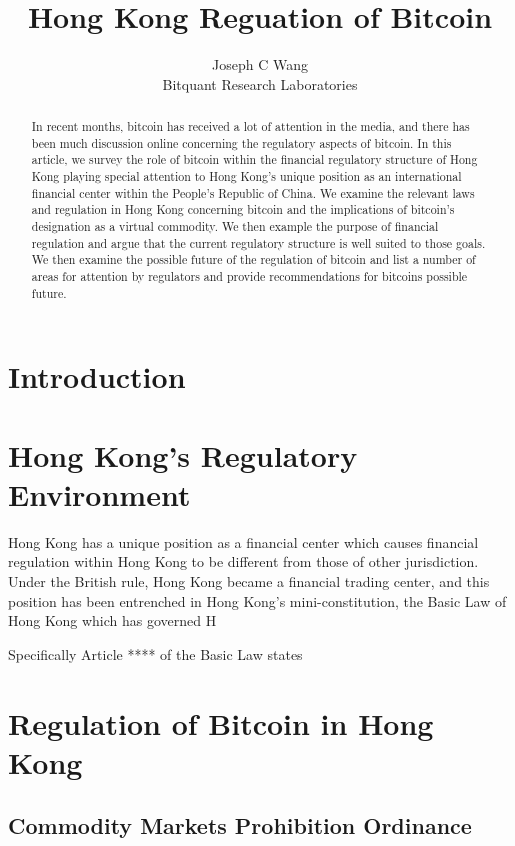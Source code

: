 \title{Hong Kong Reguation of Bitcoin}
\author{Joseph C Wang\\
\small Bitquant Research Laboratories
}

\begin{abstract}
In recent months, bitcoin has received a lot of attention in the
media, and there has been much discussion online concerning the
regulatory aspects of bitcoin.  In this article, we survey the role of
bitcoin within the financial regulatory structure of Hong Kong playing
special attention to Hong Kong's unique position as an international
financial center within the People's Republic of China.  We examine
the relevant laws and regulation in Hong Kong concerning bitcoin and
the implications of bitcoin's designation as a virtual commodity.  We
then example the purpose of financial regulation and argue that the
current regulatory structure is well suited to those goals.  We then
examine the possible future of the regulation of bitcoin and list a
number of areas for attention by regulators and provide
recommendations for bitcoins possible future.
\end{abstract}

\section{Introduction}

\section{Hong Kong's Regulatory Environment}
Hong Kong has a unique position as a financial center which causes
financial regulation within Hong Kong to be different from those of
other jurisdiction.  Under the British rule, Hong Kong became a
financial trading center, and this position has been entrenched in
Hong Kong's mini-constitution, the Basic Law of Hong Kong which has
governed H

Specifically Article **** of the Basic Law states

\section{Regulation of Bitcoin in Hong Kong}



\subsection{Commodity Markets Prohibition Ordinance}


